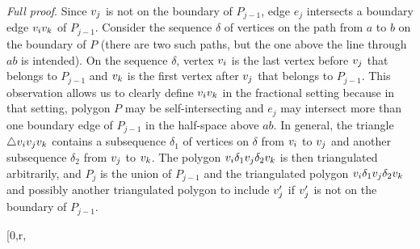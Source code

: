 \documentclass[final]{siamltex}
\newcommand{\edge}{e}
\newcommand{\polygon}{P}
\newenvironment{fullproof}{\par{\it Full proof}. \ignorespaces}{\endproof}
\begin{document}
\begin{fullproof}
Since $v_j$ is not on the boundary of $\polygon_{j-1}$, edge $\edge_j$ intersects a boundary edge $v_i v_k$ of $\polygon_{j-1}$.
Consider the sequence $\delta$ of vertices on the path from $a$ to $b$ on the boundary of $\polygon$
(there are two such paths, but the one above the line through $a b$ is intended).
On the sequence $\delta$, vertex $v_i$ is the last vertex before $v_j$ that belongs to $\polygon_{j-1}$ and 
$v_k$ is the first vertex after $v_j$ that belongs to $\polygon_{j-1}$. 
This observation allows us to clearly define $v_i v_k$ in 
the fractional setting because in that setting, polygon $\polygon$ may be self-intersecting 
and $\edge_j$ may intersect more than one boundary edge of $\polygon_{j-1}$ in the half-space above $a b$.
In general, the triangle $\triangle{v_i v_j v_k}$ contains a
subsequence $\delta_1$ of vertices on $\delta$ from $v_i$ to $v_j$ 
and another subsequence $\delta_2$ from $v_j$ to $v_k$. 
The polygon $v_i\delta_1 v_j\delta_2 v_k$ is then triangulated arbitrarily, 
and $\polygon_j$ is the union of $\polygon_{j-1}$ and the triangulated polygon $v_i\delta_1 v_j\delta_2 v_k$ and 
possibly another triangulated polygon to include $v'_j$ if $v'_j$ is not on the boundary of $\polygon_{j-1}$.
\begin{window}[0,r,{}
\end{window}
\end{fullproof}
\end{document}
